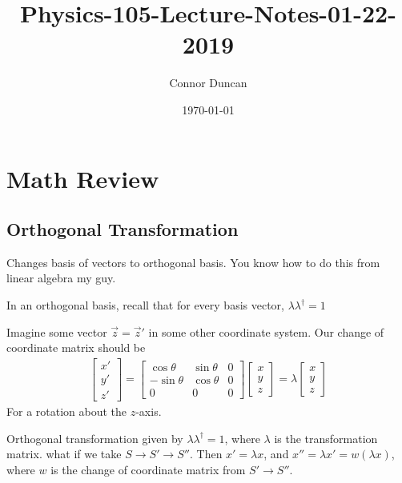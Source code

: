 \documentclass{article} \usepackage{amsmath} \usepackage{amssymb} \usepackage{amsthm} \usepackage[margin=0.2in]{geometry} \usepackage{hyperref} \usepackage{physics} \usepackage{tikz} \usepackage{mathtools} \mathtoolsset{showonlyrefs} \theoremstyle{definition} \newtheorem{theorem}{Theorem}[section] \newtheorem{corollary}{Corollary}[theorem] \newtheorem{lemma}[theorem]{Lemma} \newtheorem{definition}{Definition}[section] \author{Connor Duncan} \date{\today}
\title{Physics-105-Lecture-Notes-01-22-2019}
\begin{document}
\maketitle\tableofcontents
\noindent{}
\section{Math Review}
\subsection{Orthogonal Transformation}
Changes basis of vectors to orthogonal basis. You know how to do this from linear algebra my guy.

In an orthogonal basis, recall that for every basis vector, $\lambda\lambda^\dag=1$

Imagine some vector $\vec{z}=\vec{z}\prime$ in some other coordinate system. Our change of coordinate matrix should be
\begin{align}
	\begin{bmatrix}
	x\prime\\y\prime\\z\prime
	\end{bmatrix}
		=
	\begin{bmatrix}
			\cos\theta &\sin\theta &0\\
			-\sin\theta&\cos\theta&0\\
			0&0&0
	\end{bmatrix}
	\begin{bmatrix}
		x\\y\\z
	\end{bmatrix}
	=
	\lambda
	\begin{bmatrix}
		x\\y\\z
	\end{bmatrix}
\end{align}
For a rotation about the $z$-axis.

Orthogonal transformation given by $\lambda\lambda^\dag=1$, where $\lambda$ is the transformation matrix.
what if we take $S\rightarrow S'\rightarrow S''$.
Then $x'=\lambda x$, and $x''=\lambda x'=w(\lambda x)$, where $w$ is the change of coordinate matrix from $S'\rightarrow S''$.
\end{document}
